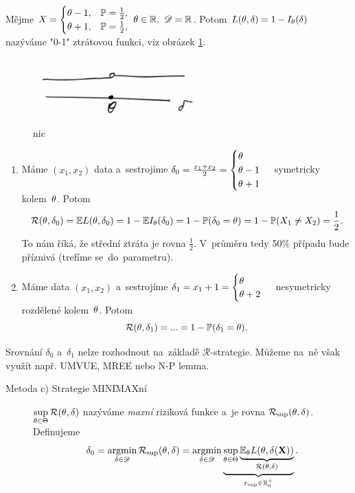 \begin{example}
	Mějme $X=\begin{cases}
	\theta-1,& \mathbb{P}=\frac{1}{2}, \\ \theta+1,& \mathbb{P}=\frac{1}{2},
	\end{cases}~\theta\in\mathbb{R},~\mathscr{D}=\mathbb{R}$. Potom
	$ L(\theta,\delta)=1-I_\theta(\delta)$ nazýváme "0-1" ztrátovou funkci, viz obrázek \ref{fig:p42}.
	\begin{figure}[h]
		\centering
		\includegraphics[width=0.4\linewidth]{pictures/P4_2}
		\caption{nic}
		\label{fig:p42}
	\end{figure}
	\begin{enumerate}[1)]
		\item Máme $(x_1,x_2)$ data a~sestrojíme $\delta_0=\frac{x_1+x_2}{2}=\begin{cases}
		\theta\\\theta-1\\\theta+1
		\end{cases}$ symetricky kolem~$\theta$. Potom
		$$ \mathcal{R}(\theta,\delta_0)=\mathbb{E} L(\theta,\delta_0)=1-\mathbb{E} I_\theta(\delta_0)=1-\mathbb{P}(\delta_0=\theta)=1-\mathbb{P}(X_1\neq X_2)=\frac{1}{2}.$$ To nám říká, že střední ztráta je rovna $\frac{1}{2}$. V~průměru tedy 50\% případu bude příznivá (trefíme se~do~parametru).
		\item Máme data $(x_1,x_2)$ a~sestrojíme $\delta_1=x_1+1=\begin{cases}
		\theta\\\theta+2
		\end{cases}$ nesymetricky rozdělené kolem~$\theta$. Potom
		$$\mathcal{R}(\theta,\delta_1)=...=1-\mathbb{P}(\delta_1=\theta).$$
	\end{enumerate}
Srovnání $\delta_0$ a~$\delta_1$ nelze rozhodnout na~základě $\mathcal{R}$-strategie. Můžeme na~ně však využít např. UMVUE, MREE nebo N-P lemma.
\end{example}
\begin{description}
	\item[Metoda c) Strategie MINIMAXní] $\sup\limits_{\theta\in\Theta} \mathcal{R}(\theta,\delta)$ nazýváme \textit{maxní} riziková funkce a~je rovna $\mathcal{R}_{\sup}(\theta,\delta)$. Definujeme 
	$$ \delta_0=\mathop{\mathrm{argmin}}\limits_{\delta\in\mathscr{D}}\mathcal{R}_{\sup}(\theta,\delta)=\mathop{\mathrm{argmin}}\limits_{\delta\in\mathscr{D}}\underbrace{\sup\limits_{\theta\in\Theta}\underbrace{\mathbb{E}_\theta L(\theta,\delta(\textbf{X}))}_{\mathcal{R}(\theta,\delta)}}_{r_{\sup}\in\mathbb{R}_0^+}.$$
\end{description}


